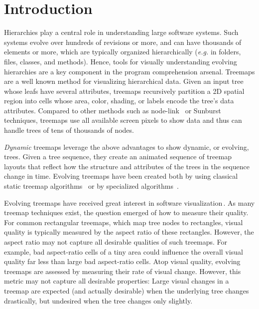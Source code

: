 \section{Introduction}
%
%
Hierarchies play a central role in understanding large software systems. Such systems evolve over hundreds of revisions or more, and can have thousands of elements or more, which are typically organized hierarchically (\emph{e.g.} in folders, files, classes, and methods). Hence, tools for visually understanding evolving hierarchies are a key component in the program comprehension arsenal. Treemaps are a well known method for visualizing hierarchical data. Given an input tree whose leafs have several attributes, treemaps recursively partition a 2D spatial region into cells whose area, color, shading, or labels encode the tree's data attributes. Compared to other methods such as node-link~\citep{harel,frick} or Sunburst~\citep{sunburst,sunburst2} techniques, treemaps use all available screen pixels to show data and thus can handle trees of tens of thousands of nodes.

\emph{Dynamic} treemaps leverage the above advantages to show dynamic, or evolving, trees. Given a tree sequence, they create an animated sequence of treemap layouts that reflect how the structure and attributes of the trees in the sequence change in time. Evolving treemaps have been created both by using classical static treemap algorithms~\citep{treevis} or by specialized algorithms~\citep{sondag17,hees17,hahn10}.

Evolving treemaps have received great interest in software visualization\,\citep{diehl08,hees17,hahn10,fisher10,gotz11}. As many treemap techniques exist, the question emerged of how to measure their quality. For common rectangular treemaps, which map tree nodes to rectangles, visual quality is typically measured by the aspect ratio of these rectangles. However, the aspect ratio may not capture all desirable qualities of such treemaps. For example, bad aspect-ratio cells of a tiny area could influence the overall visual quality far less than large bad aspect-ratio cells. Atop visual quality, evolving treemaps are assessed by measuring their rate of visual change. However, this metric may not capture all desirable properties: Large visual changes in a treemap are expected (and actually desirable) when the underlying tree changes drastically, but undesired when the tree changes only slightly.

